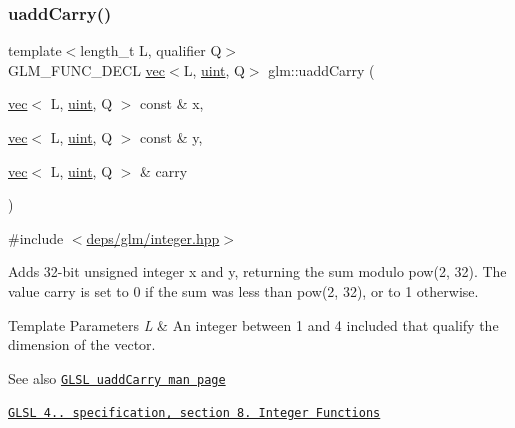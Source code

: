 \mbox{\label{group__core__func__integer_gaedcec48743632dff6786bcc492074b1b}} 
\subsubsection{\texorpdfstring{uadd\+Carry()}{uaddCarry()}}
{\footnotesize\ttfamily template$<$length\+\_\+t L, qualifier Q$>$ \\
G\+L\+M\+\_\+\+F\+U\+N\+C\+\_\+\+D\+E\+CL \hyperlink{structglm_1_1vec}{vec}$<$L, \hyperlink{group__core__precision_ga4fd29415871152bfb5abd588334147c8}{uint}, Q$>$ glm\+::uadd\+Carry (\begin{DoxyParamCaption}\item[{\hyperlink{structglm_1_1vec}{vec}$<$ L, \hyperlink{group__core__precision_ga4fd29415871152bfb5abd588334147c8}{uint}, Q $>$ const \&}]{x,  }\item[{\hyperlink{structglm_1_1vec}{vec}$<$ L, \hyperlink{group__core__precision_ga4fd29415871152bfb5abd588334147c8}{uint}, Q $>$ const \&}]{y,  }\item[{\hyperlink{structglm_1_1vec}{vec}$<$ L, \hyperlink{group__core__precision_ga4fd29415871152bfb5abd588334147c8}{uint}, Q $>$ \&}]{carry }\end{DoxyParamCaption})}



{\ttfamily \#include $<$\hyperlink{integer_8hpp}{deps/glm/integer.\+hpp}$>$}

Adds 32-\/bit unsigned integer x and y, returning the sum modulo pow(2, 32). The value carry is set to 0 if the sum was less than pow(2, 32), or to 1 otherwise.


\begin{DoxyTemplParams}{Template Parameters}
{\em L} & An integer between 1 and 4 included that qualify the dimension of the vector.\\
\hline
\end{DoxyTemplParams}
\begin{DoxySeeAlso}{See also}
\href{http://www.opengl.org/sdk/docs/manglsl/xhtml/uaddCarry.xml}{\tt G\+L\+SL uadd\+Carry man page} 

\href{http://www.opengl.org/registry/doc/GLSLangSpec.4.20.8.pdf}{\tt G\+L\+SL 4.. specification, section 8. Integer Functions} 
\end{DoxySeeAlso}



